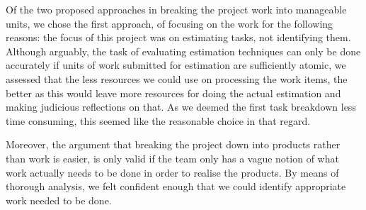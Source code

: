 Of the two proposed approaches in breaking the project work into manageable units, we chose the first approach, of focusing on the work for the following reasons: the focus of this project was on estimating tasks, not identifying them. Although arguably, the task of evaluating estimation techniques can only be done accurately if units of work submitted for estimation are sufficiently atomic, we assessed that the less resources we could use on processing the work items, the better as this would leave more resources for doing the actual estimation and making judicious reflections on that. As we deemed the first task breakdown less time consuming, this seemed like the reasonable choice in that regard.

Moreover, the argument that breaking the project down into products rather than work is easier, is only valid if the team only has a vague notion of what work actually needs to be done in order to realise the products. By means of thorough analysis, we felt confident enough that we could identify appropriate work needed to be done.
